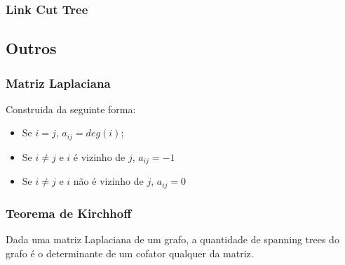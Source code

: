 \subsubsection{Link Cut Tree}
\divisor

\subsection{Outros}
\subsubsection{Matriz Laplaciana}
Construida da seguinte forma:

\begin{itemize}
\item Se $i = j$, $a_{ij}=deg(i)$;
\item Se $i \neq j$ e $i$ é vizinho de $j$, $a_{ij}=-1$
\item Se $i \neq j$ e $i$ não é vizinho de $j$, $a_{ij}=0$
\end{itemize}

\subsubsection{Teorema de Kirchhoff}
Dada uma matriz Laplaciana de um grafo, a quantidade de spanning trees do grafo é o determinante de um cofator qualquer da matriz.
\divisor
